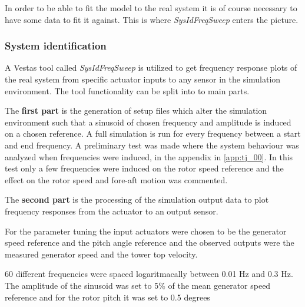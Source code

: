 \medskip
In order to be able to fit the model to the real system it is of course necessary to have some data to fit it against. This is where \textit{SysIdFreqSweep} enters the picture.

\subsubsection{System identification}
A Vestas tool called \textit{SysIdFreqSweep} is utilized to get frequency response plots of the real system from specific actuator inputs to any sensor in the simulation environment. The tool functionality can be split into to main parts. 

The \textbf{first part} is the generation of setup files which alter the simulation environment such that a sinusoid of chosen frequency and amplitude is induced on a chosen reference. A full simulation is run for every frequency between a start and end frequency. A preliminary test was made where the system behaviour was analyzed when frequencies were induced, in the appendix in \cref{app:tj_00}. In this test only a few frequencies were induced on the rotor speed reference and the effect on the rotor speed and fore-aft motion was commented.

The \textbf{second part} is the processing of the simulation output data to plot frequency responses from the actuator to an output sensor. 

\medskip
For the parameter tuning the input actuators were chosen to be the generator speed reference and the pitch angle reference and the observed outputs were the measured generator speed and the tower top velocity.

60 different frequencies were spaced logaritmacally between 0.01 Hz and 0.3 Hz. The amplitude of the sinusoid was set to 5\% of the mean generator speed reference and for the rotor pitch it was set to 0.5 degrees 
